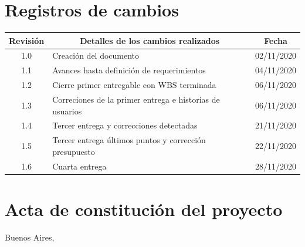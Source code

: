 \documentclass[11pt]{charter}
\begin{document}
\maketitle
\thispagestyle{empty}
\pagebreak


\thispagestyle{empty}
{\setlength{\parskip}{0pt}
\tableofcontents{}
}
\pagebreak


\section{Registros de cambios}
\label{sec:registro}


\begin{table}[ht]
\label{tab:registro}
\centering
\begin{tabularx}{\linewidth}{@{}|c|X|c|@{}}
\hline
\rowcolor[HTML]{C0C0C0} 
Revisión & \multicolumn{1}{c|}{\cellcolor[HTML]{C0C0C0}Detalles de los cambios realizados} & Fecha      \\ \hline
1.0      & Creación del documento                                          & 02/11/2020 \\ \hline
1.1      & Avances hasta definición de requerimientos                                          & 04/11/2020 \\ \hline
1.2      & Cierre primer entregable con WBS terminada
& 06/11/2020 \\ \hline
1.3      & Correciones de la primer entrega e historias de usuarios
& 06/11/2020 \\ \hline
1.4      & Tercer entrega y correcciones detectadas
& 21/11/2020 \\ \hline
1.5      & Tercer entrega últimos puntos y corrección presupuesto
& 22/11/2020 \\ \hline
1.6      & Cuarta entrega
& 28/11/2020 \\ \hline
\end{tabularx}
\end{table}

\pagebreak



\section{Acta de constitución del proyecto}
\label{sec:acta}

\begin{flushright}
Buenos Aires, \fechaInicioName
\end{flushright}

\vspace{2cm}
\end{document}
